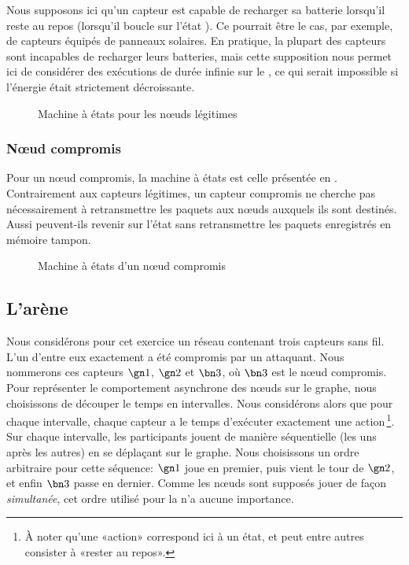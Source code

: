 Nous supposons ici qu'un capteur est capable de recharger sa batterie lorsqu'il reste au repos (\cad lorsqu'il boucle sur l'état \idle).
Ce pourrait être le cas, par exemple, de capteurs équipés de panneaux solaires.
En pratique, la plupart des capteurs sont incapables de recharger leurs batteries, mais cette supposition nous permet ici de considérer des exécutions de durée infinie sur le , ce qui serait impossible si l'énergie était strictement décroissante.
\begin{figure}[H]
    \centering
    
    \caption{Machine à états pour les nœuds légitimes}\label{tj:fig:autGoodNode}
\end{figure}

        \subsubsection{Nœud compromis}
Pour un nœud compromis, la machine à états est celle présentée en .
Contrairement aux capteurs légitimes, un capteur compromis ne cherche pas nécessairement à retransmettre les paquets aux nœuds auxquels ils sont destinés.
Aussi peuvent-ils revenir sur l'état \idle sans retransmettre les paquets enregistrés en mémoire tampon.
\begin{figure}[H]
    \centering
    
    \caption{Machine à états d'un nœud compromis}\label{tj:fig:autBadNode}
\end{figure}

\subsection{L'arène}
Nous considérons pour cet exercice un réseau contenant trois capteurs sans fil.
L'un d'entre eux exactement a été compromis par un attaquant.
Nous nommerons ces capteurs $\gn1$, $\gn2$ et $\bn3$, où $\bn3$ est le nœud compromis.
Pour représenter le comportement asynchrone des nœuds sur le graphe, nous choisissons de découper le temps en intervalles.
Nous considérons alors que pour chaque intervalle, chaque capteur a le temps d'exécuter exactement une action\,\footnote{À noter qu'une «action» correspond ici à un état, et peut entre autres consister à «rester au repos».}.
Sur chaque intervalle, les participants jouent de manière séquentielle (les uns après les autres) en se déplaçant sur le graphe.
Nous choisissons un ordre arbitraire pour cette séquence: $\gn1$ joue en premier, puis vient le tour de $\gn2$, et enfin $\bn3$ passe en dernier.
Comme les nœuds sont supposés jouer de façon \emph{simultanée}, cet ordre utilisé pour la  n'a aucune importance.

